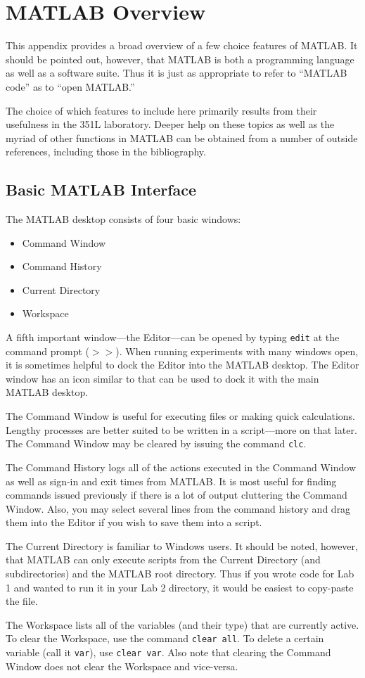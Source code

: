 \chapter{MATLAB Overview} \label{app:matlaboverview}

This appendix provides a broad overview of a few choice features of MATLAB.  It should be pointed out, however, that MATLAB is both a programming language as well as a software suite.  Thus it is just as appropriate to refer to ``MATLAB code'' as to ``open MATLAB.''
\par
The choice of which features to include here primarily results from their usefulness in the 351L laboratory.  Deeper help on these topics as well as the myriad of other functions in MATLAB can be obtained from a number of outside references, including those in the bibliography.

\section{Basic MATLAB Interface}
The MATLAB desktop consists of four basic windows:
\begin{itemize}
    \item Command Window
    \item Command History
    \item Current Directory
    \item Workspace
\end{itemize}
A fifth important window---the Editor---can be opened by typing \verb=edit= at the command prompt ($>>$).  When running experiments with many windows open, it is sometimes helpful to dock the Editor into the MATLAB desktop.  The Editor window has an icon similar to  that can be used to dock it with the main MATLAB desktop.
\par
The Command Window is useful for executing files or making quick calculations.  Lengthy processes are better suited to be written in a script---more on that later.  The Command Window may be cleared by issuing the command \verb=clc=.
\par
The Command History logs all of the actions executed in the Command Window as well as sign-in and exit times from MATLAB.  It is most useful for finding commands issued previously if there is a lot of output cluttering the Command Window.  Also, you may select several lines from the command history and drag them into the Editor if you wish to save them into a script.
\par
The Current Directory is familiar to Windows users.  It should be noted, however, that MATLAB can only execute scripts from the Current Directory (and subdirectories) and the MATLAB root directory.  Thus if you wrote code for Lab 1 and wanted to run it in your Lab 2 directory, it would be easiest to copy-paste the file.
\par
The Workspace lists all of the variables (and their type) that are currently active.  To clear the Workspace, use the command \verb=clear all=.  To delete a certain variable (call it \verb=var=), use \verb=clear var=.  Also note that clearing the Command Window does not clear the Workspace and vice-versa.

